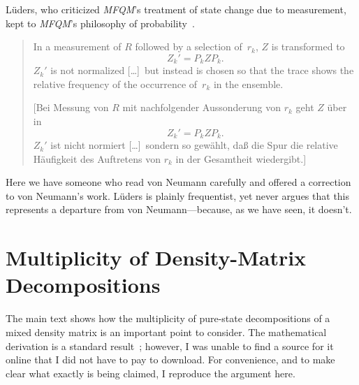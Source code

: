 \documentclass[aps,pra,superscriptaddress,12pt,tightenlines,nofootinbib]{revtex4-2}
\newcommand{\MFQM}{\textsl{MFQM}}
\begin{document}
L\"uders, who criticized \MFQM's treatment of state change due to
measurement, kept to \MFQM's philosophy of
probability~\cite{Lueders1951}.
\begin{quotation}
\noindent In a measurement of $R$ followed by a selection of~$r_k$,
$Z$ is transformed to
\begin{displaymath}
Z_k' = P_k Z P_k.
\end{displaymath}
$Z_k'$ is not normalized [\ldots\!]\ but instead is chosen so that the
trace shows the relative frequency of the occurrence of~$r_k$ in the
ensemble.

[Bei Messung von $R$ mit nachfolgender Aussonderung von $r_k$ geht $Z$
  \"uber in
\begin{displaymath}
Z_k' = P_k Z P_k.
\end{displaymath}
$Z_k'$ ist nicht normiert [\ldots\!]\ sondern so gew\"ahlt, da\ss{} die
Spur die relative H\"aufigkeit des Auftretens von $r_k$ in der
Gesamtheit wiedergibt.]
\end{quotation}
Here we have someone who read von Neumann carefully and offered a
correction to von Neumann's work.  L\"uders is plainly frequentist,
yet never argues that this represents a departure from von
Neumann---because, as we have seen, it doesn't.


\section{Multiplicity of Density-Matrix Decompositions}

The main text shows how the multiplicity of pure-state decompositions
of a mixed density matrix is an important point to consider.  The
mathematical derivation is a standard result~\cite{Schroedinger1936,
  Hughston1993}; however, I was unable to find a source for it online
that I did not have to pay to download.  For convenience, and to make
clear what exactly is being claimed, I reproduce the argument here.
\end{document}

